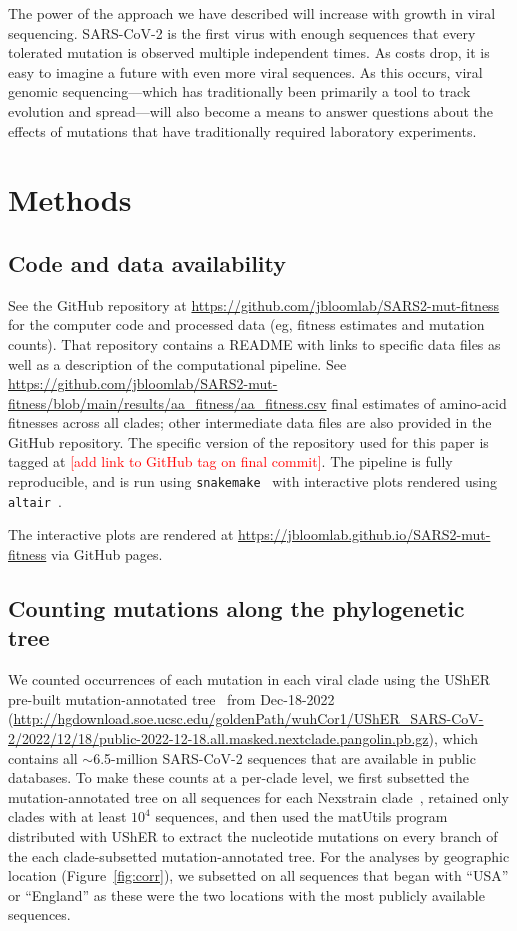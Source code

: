 \documentclass[9pt,twocolumn,twoside]{gsajnl_modified}
\newcommand\jdbcomment[1]{\textcolor{red}{[#1]}}
\begin{document}
The power of the approach we have described will increase with growth in viral sequencing.
SARS-CoV-2 is the first virus with enough sequences that every tolerated mutation is observed multiple independent times.
As costs drop, it is easy to imagine a future with even more viral sequences.
As this occurs, viral genomic sequencing---which has traditionally been primarily a tool to track evolution and spread---will also become a means to answer questions about the effects of mutations that have traditionally required laboratory experiments.
 

{\small

\section{Methods}
\subsection{Code and data availability}
See the GitHub repository at \url{https://github.com/jbloomlab/SARS2-mut-fitness} for the computer code and processed data (eg, fitness estimates and mutation counts).
That repository contains a README with links to specific data files as well as a description of the computational pipeline.
See \url{https://github.com/jbloomlab/SARS2-mut-fitness/blob/main/results/aa_fitness/aa_fitness.csv} final estimates of amino-acid fitnesses across all clades; other intermediate data files are also provided in the GitHub repository.
The specific version of the repository used for this paper is tagged at \jdbcomment{add link to GitHub tag on final commit}.
The pipeline is fully reproducible, and is run using \texttt{snakemake}~\citep{molder2021sustainable} with interactive plots rendered using \texttt{altair}~\citep{vanderplas2018altair}.

The interactive plots are rendered at \url{https://jbloomlab.github.io/SARS2-mut-fitness} via GitHub pages.

\subsection{Counting mutations along the phylogenetic tree}
We counted occurrences of each mutation in each viral clade using the UShER pre-built mutation-annotated tree~\citep{mcbroome2021daily,turakhia2021ultrafast,lanfear2020} from Dec-18-2022 (\url{http://hgdownload.soe.ucsc.edu/goldenPath/wuhCor1/UShER_SARS-CoV-2/2022/12/18/public-2022-12-18.all.masked.nextclade.pangolin.pb.gz}), which contains all $\sim$6.5-million SARS-CoV-2 sequences that are available in public databases.
To make these counts at a per-clade level, we first subsetted the mutation-annotated tree on all sequences for each Nexstrain clade~\citep{aksamentov2021nextclade}, retained only clades with at least $10^4$ sequences, and then used the matUtils program distributed with UShER to extract the nucleotide mutations on every branch of the each clade-subsetted mutation-annotated tree.
For the analyses by geographic location (Figure~\ref{fig:corr}), we subsetted on all sequences that began with ``USA'' or ``England'' as these were the two locations with the most publicly available sequences.

}
\end{document}
